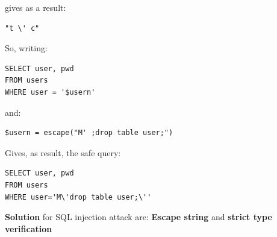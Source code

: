 gives as a result:
\begin{lstlisting} 
"t \' c"
\end{lstlisting}
So, writing:
\begin{lstlisting} 
SELECT user, pwd 
FROM users 
WHERE user = '$usern'
\end{lstlisting}
and:
\begin{lstlisting} 
$usern = escape("M' ;drop table user;")
\end{lstlisting}
Gives, as result, the safe query:
\begin{lstlisting} 
SELECT user, pwd 
FROM users 
WHERE user='M\'drop table user;\''
\end{lstlisting}
\textbf{Solution} for SQL injection attack are: \textbf{Escape string} and \textbf{strict type verification}